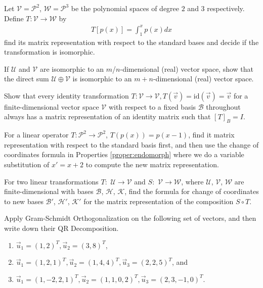 \begin{Exercise}
Let $\mathcal{V} = \mathcal{P}^2$, $\mathcal{W} = \mathcal{P}^3$ be the polynomial spaces of degree $2$ and $3$ respectively. Define $T: \mathcal{V} \to \mathcal{W}$ by
\begin{align*}
T[p(x)] = \int_1^x p(x) dx
\end{align*}
find its matrix representation with respect to the standard bases and decide if the transformation is isomorphic.
\end{Exercise}

\begin{Exercise}
If $\mathcal{U}$ and $\mathcal{V}$ are isomorphic to an $m$/$n$-dimensional (real) vector space, show that the direct sum $\mathcal{U} \oplus \mathcal{V}$ is isomorphic to an $m+n$-dimensional (real) vector space.
\end{Exercise}

\begin{Exercise}
Show that every identity transformation $T: \mathcal{V} \to \mathcal{V}, T(\vec{v}) = \text{id}(\vec{v}) = \vec{v}$ for a finite-dimensional vector space $\mathcal{V}$ with respect to a fixed basis $\mathcal{B}$ throughout always has a matrix representation of an identity matrix such that $[T]_B = I$. 
\end{Exercise}

\begin{Exercise}
For a linear operator $T: \mathcal{P}^2 \to \mathcal{P}^2$, $T(p(x)) = p(x-1)$, find it matrix representation with respect to the standard basis first, and then use the change of coordinates formula in Properties \ref{proper:endomorph} where we do a variable substitution of $x' = x+2$ to compute the new matrix representation.
\end{Exercise}

\begin{Exercise}
For two linear transformations $T:$ $\mathcal{U} \to \mathcal{V}$ and $S:$ $\mathcal{V} \to \mathcal{W}$, where $\mathcal{U}$, $\mathcal{V}$, $\mathcal{W}$ are finite-dimensional with bases $\mathcal{B}$, $\mathcal{H}$, $\mathcal{K}$, find the formula for change of coordinates to new bases $\mathcal{B}'$, $\mathcal{H}'$, $\mathcal{K}'$ for the matrix representation of the composition $S \circ T$.
\end{Exercise}

\begin{Exercise}
Apply Gram-Schmidt Orthogonalization on the following set of vectors, and then write down their QR Decomposition.
\begin{enumerate}[label=(\alph*)]
\item $\vec{u}_1 = (1,2)^T, \vec{u}_2 = (3,8)^T$,
\item $\vec{u}_1 = (1,2,1)^T, \vec{u}_2 = (1,4,4)^T, \vec{u}_3 = (2,2,5)^T$, and
\item $\vec{u}_1 = (1,-2,2,1)^T, \vec{u}_2 = (1,1,0,2)^T, \vec{u}_3 = (2,3,-1,0)^T$.
\end{enumerate}  
\end{Exercise}